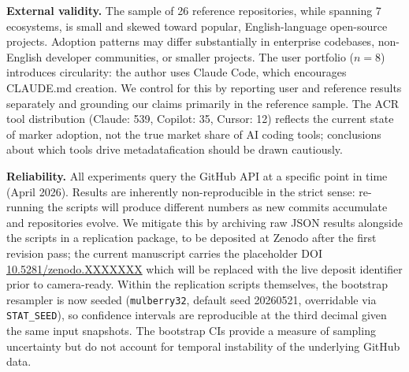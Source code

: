 \documentclass[12pt]{article}
\begin{document}
\textbf{External validity.} The sample of 26 reference repositories, while spanning 7 ecosystems, is small and skewed toward popular, English-language open-source projects. Adoption patterns may differ substantially in enterprise codebases, non-English developer communities, or smaller projects. The user portfolio ($n=8$) introduces circularity: the author uses Claude Code, which encourages CLAUDE.md creation. We control for this by reporting user and reference results separately and grounding our claims primarily in the reference sample. The ACR tool distribution (Claude: 539, Copilot: 35, Cursor: 12) reflects the current state of marker adoption, not the true market share of AI coding tools; conclusions about which tools drive metadatafication should be drawn cautiously.

\textbf{Reliability.} All experiments query the GitHub API at a specific point in time (April 2026). Results are inherently non-reproducible in the strict sense: re-running the scripts will produce different numbers as new commits accumulate and repositories evolve. We mitigate this by archiving raw JSON results alongside the scripts in a replication package, to be deposited at Zenodo after the first revision pass; the current manuscript carries the placeholder DOI \href{https://doi.org/10.5281/zenodo.XXXXXXX}{10.5281/zenodo.XXXXXXX} which will be replaced with the live deposit identifier prior to camera-ready. Within the replication scripts themselves, the bootstrap resampler is now seeded (\texttt{mulberry32}, default seed 20260521, overridable via \texttt{STAT\_SEED}), so confidence intervals are reproducible at the third decimal given the same input snapshots. The bootstrap CIs provide a measure of sampling uncertainty but do not account for temporal instability of the underlying GitHub data.
\end{document}
